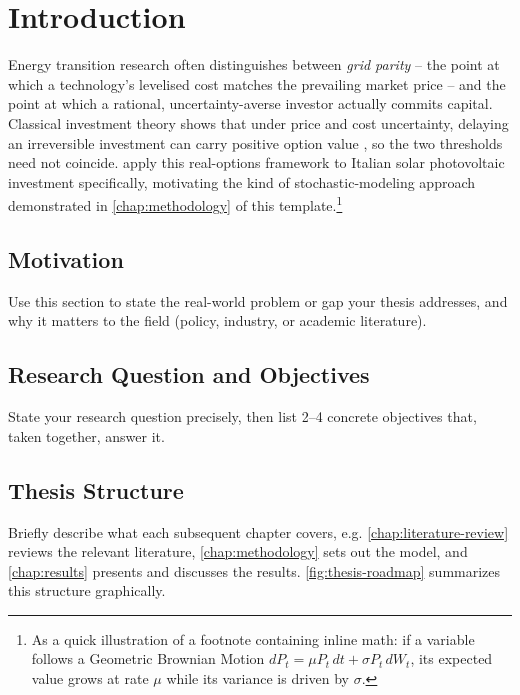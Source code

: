 \chapter{Introduction}
\label{chap:introduction}


Energy transition research often distinguishes between \emph{grid parity} -- the point at which a technology's levelised cost matches the prevailing market price -- and the point at which a rational, uncertainty-averse investor actually commits capital. Classical investment theory shows that under price and cost uncertainty, delaying an irreversible investment can carry positive option value \citep{dixit1994}, so the two thresholds need not coincide. \citet{biondi2015solar} apply this real-options framework to Italian solar photovoltaic investment specifically, motivating the kind of stochastic-modeling approach demonstrated in \cref{chap:methodology} of this template.\footnote{As a quick illustration of a footnote containing inline math: if a variable follows a Geometric Brownian Motion $dP_t = \mu P_t\,dt + \sigma P_t\,dW_t$, its expected value grows at rate $\mu$ while its variance is driven by $\sigma$.}

\section{Motivation}
Use this section to state the real-world problem or gap your thesis addresses, and why it matters to the field (policy, industry, or academic literature).

\section{Research Question and Objectives}
State your research question precisely, then list 2--4 concrete objectives that, taken together, answer it.

\section{Thesis Structure}
Briefly describe what each subsequent chapter covers, e.g. \cref{chap:literature-review} reviews the relevant literature, \cref{chap:methodology} sets out the model, and \cref{chap:results} presents and discusses the results. \cref{fig:thesis-roadmap} summarizes this structure graphically.

